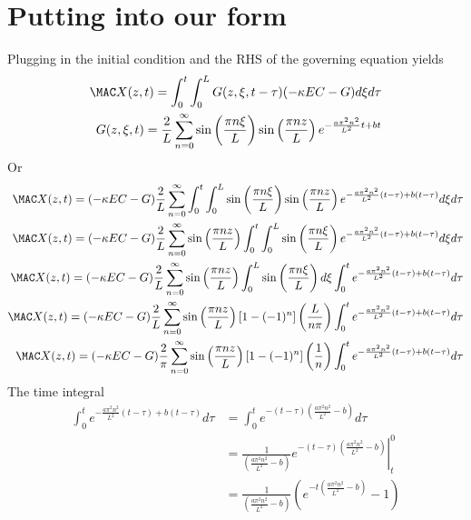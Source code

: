 \documentclass[11pt]{article}
\begin{document}
\section{Putting into our form}
Plugging in the initial condition and the RHS of the governing equation yields
\begin{equation}\begin{aligned}
\MAC X(z,t) =  \int_0^t \int_0^L G(z,\xi,t-\tau) (- \kappa EC -G) d\xi d\tau \\
G(z,\xi,t) = \frac{2}{L} \sum_{n=0}^{\infty}
\sin\left(\frac{\pi n \xi}{L}\right)
\sin\left(\frac{\pi n z}{L}\right)
e^{- \frac{a\pi^2n^2}{L^2}t + b t }
\\
\end{aligned} \end{equation}
Or
\begin{equation}\begin{aligned}
\MAC X(z,t) =  (- \kappa EC -G) \frac{2}{L} \sum_{n=0}^{\infty} \int_0^t \int_0^L \sin\left(\frac{\pi n \xi}{L}\right) \sin\left(\frac{\pi n z}{L}\right) e^{- \frac{a\pi^2n^2}{L^2}(t-\tau) + b (t-\tau) } d\xi d\tau \\
\MAC X(z,t) =  (- \kappa EC -G) \frac{2}{L} \sum_{n=0}^{\infty} \sin\left(\frac{\pi n z}{L}\right) \int_0^t \int_0^L \sin\left(\frac{\pi n \xi}{L}\right) e^{- \frac{a\pi^2n^2}{L^2}(t-\tau) + b (t-\tau) } d\xi d\tau \\
\MAC X(z,t) =  (- \kappa EC -G) \frac{2}{L} \sum_{n=0}^{\infty} \sin\left(\frac{\pi n z}{L}\right) \int_0^L \sin\left(\frac{\pi n \xi}{L}\right) d\xi \int_0^t e^{- \frac{a\pi^2n^2}{L^2}(t-\tau) + b (t-\tau) } d\tau \\
\MAC X(z,t) =  (- \kappa EC -G) \frac{2}{L} \sum_{n=0}^{\infty} \sin\left(\frac{\pi n z}{L}\right) [1-(-1)^n] \left( \frac{L}{n\pi} \right) \int_0^t e^{- \frac{a\pi^2n^2}{L^2}(t-\tau) + b (t-\tau) } d\tau \\
\MAC X(z,t) =  (- \kappa EC -G) \frac{2}{\pi} \sum_{n=0}^{\infty} \sin\left(\frac{\pi n z}{L}\right) [1-(-1)^n] \left( \frac{1}{n} \right) \int_0^t e^{- \frac{a\pi^2n^2}{L^2}(t-\tau) + b (t-\tau) } d\tau \\
\end{aligned} \end{equation}
The time integral
\begin{equation}\begin{aligned}
\int_0^t e^{- \frac{a\pi^2n^2}{L^2}(t-\tau) + b (t-\tau) } d\tau &= \int_0^t e^{-(t-\tau) \left(\frac{a\pi^2n^2}{L^2} - b\right)} d\tau \\
                                                                 &= \frac{1}{\left(\frac{a\pi^2n^2}{L^2} - b\right)} \left. e^{-(t-\tau) \left(\frac{a\pi^2n^2}{L^2} - b\right)} \right|_t^0 \\
                                                                 &= \frac{1}{\left(\frac{a\pi^2n^2}{L^2} - b\right)} \left( e^{-t\left(\frac{a\pi^2n^2}{L^2} - b\right)} - 1 \right) \\
\end{aligned} \end{equation}
\end{document}
